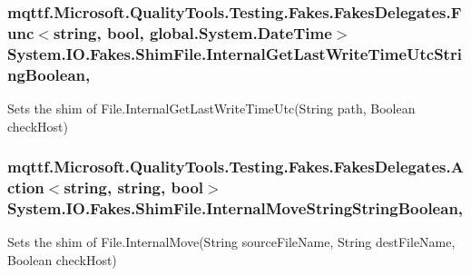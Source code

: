 \hypertarget{class_system_1_1_i_o_1_1_fakes_1_1_shim_file_a45a25a581fa2cca2e8b1ffa3ee24cd18}{
\subsubsection[{Internal\-Get\-Last\-Write\-Time\-Utc\-String\-Boolean}]{\setlength{\rightskip}{0pt plus 5cm}mqttf.\-Microsoft.\-Quality\-Tools.\-Testing.\-Fakes.\-Fakes\-Delegates.\-Func$<$string, bool, global.\-System.\-Date\-Time$>$ System.\-I\-O.\-Fakes.\-Shim\-File.\-Internal\-Get\-Last\-Write\-Time\-Utc\-String\-Boolean\hspace{0.3cm}{\ttfamily [static]}, {\ttfamily [set]}}}\label{class_system_1_1_i_o_1_1_fakes_1_1_shim_file_a45a25a581fa2cca2e8b1ffa3ee24cd18}


Sets the shim of File.\-Internal\-Get\-Last\-Write\-Time\-Utc(\-String path, Boolean check\-Host)

\hypertarget{class_system_1_1_i_o_1_1_fakes_1_1_shim_file_ab2b5e0f13ee8547e3fad8811c9ca2bdb}{
\subsubsection[{Internal\-Move\-String\-String\-Boolean}]{\setlength{\rightskip}{0pt plus 5cm}mqttf.\-Microsoft.\-Quality\-Tools.\-Testing.\-Fakes.\-Fakes\-Delegates.\-Action$<$string, string, bool$>$ System.\-I\-O.\-Fakes.\-Shim\-File.\-Internal\-Move\-String\-String\-Boolean\hspace{0.3cm}{\ttfamily [static]}, {\ttfamily [set]}}}\label{class_system_1_1_i_o_1_1_fakes_1_1_shim_file_ab2b5e0f13ee8547e3fad8811c9ca2bdb}


Sets the shim of File.\-Internal\-Move(\-String source\-File\-Name, String dest\-File\-Name, Boolean check\-Host)

